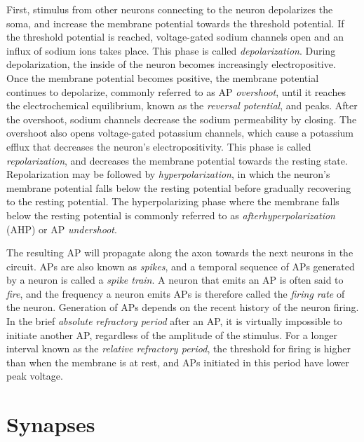 First, stimulus from other neurons connecting to the neuron depolarizes the soma, and increase the membrane potential towards the threshold potential. If the threshold potential is reached, voltage-gated sodium channels open and an influx of sodium ions takes place. This phase is called \textit{depolarization}. During depolarization, the inside of the neuron becomes increasingly electropositive. Once the membrane potential becomes positive, the membrane potential continues to depolarize, commonly referred to as AP \textit{overshoot}, until it reaches the electrochemical equilibrium, known as the \textit{reversal potential}, and peaks. After the overshoot, sodium channels decrease the sodium permeability by closing. The overshoot also opens voltage-gated potassium channels, which cause a potassium efflux that decreases the neuron's electropositivity. This phase is called \textit{repolarization}, and decreases the membrane potential towards the resting state. Repolarization may be followed by \textit{hyperpolarization}, in which the neuron's membrane potential falls below the resting potential before gradually recovering to the resting potential. The hyperpolarizing phase where the membrane falls below the resting potential is commonly referred to as \textit{afterhyperpolarization} (AHP) or AP \textit{undershoot}.  

The resulting AP will propagate along the axon towards the next neurons in the circuit. APs are also known as \textit{spikes}, and a temporal sequence of APs generated by a neuron is called a \textit{spike train}. A neuron that emits an AP is often said to \textit{fire}, and the frequency a neuron emits APs is therefore called the \textit{firing rate} of the neuron. Generation of APs depends on the recent history of the neuron firing. In the brief \textit{absolute refractory period} after an AP, it is virtually impossible to initiate another AP, regardless of the amplitude of the stimulus. For a longer interval known as the \textit{relative refractory period}, the threshold for firing is higher than when the membrane is at rest, and APs initiated in this period have lower peak voltage. 


\section{Synapses}

